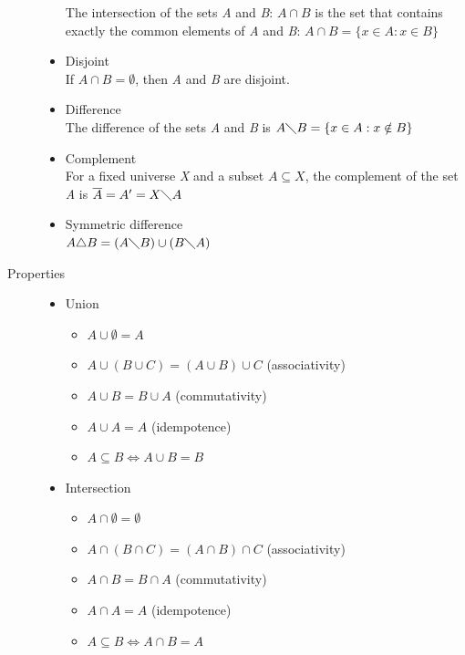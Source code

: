 \documentclass[margin=0px]{article}
\begin{document}
\begin{description}
\begin{itemize}
                  The intersection of the sets {\it A} and {\it B}: $A \cap B$ is the set that contains exactly the common elements of {\it A} and {\it B}: $A \cap B = \{ x \in A : x \in B \}$
            \item Disjoint \\
                  If $A \cap B = \emptyset$, then {\it A} and {\it B} are disjoint.
            \item Difference \\
                  The difference of the sets {\it A} and {\it B} is $A \diagdown B = \{ x \in A : x \notin B \}$
            \item Complement \\
                  For a fixed universe {\it X} and a subset $A \subseteq X$, the complement of the set {\it A} is $ \overline{A} = A' = X \diagdown A$
            \item Symmetric difference \\
                  $A \triangle B = (A \diagdown B) \cup (B \diagdown A)$
        \end{itemize}
    \item[Properties] \hfill
        \begin{itemize}
            \item Union
                  \begin{itemize}
                      \item $A \cup \emptyset = A$
                      \item $A \cup ( B \cup C ) = (A \cup B) \cup C$ (associativity)
                      \item $A \cup B = B \cup A$ (commutativity)
                      \item $A \cup A = A$ (idempotence)
                      \item $A \subseteq B \Longleftrightarrow A \cup B = B$
                  \end{itemize}
            \item Intersection
                  \begin{itemize}
                      \item $A \cap \emptyset = \emptyset$
                      \item $A \cap ( B \cap C ) = (A \cap B) \cap C$ (associativity)
                      \item $A \cap B = B \cap A$ (commutativity)
                      \item $A \cap A = A$ (idempotence)
                      \item $A \subseteq B \Longleftrightarrow A \cap B = A$

\end{itemize}
\end{itemize}
\end{description}
\end{document}
